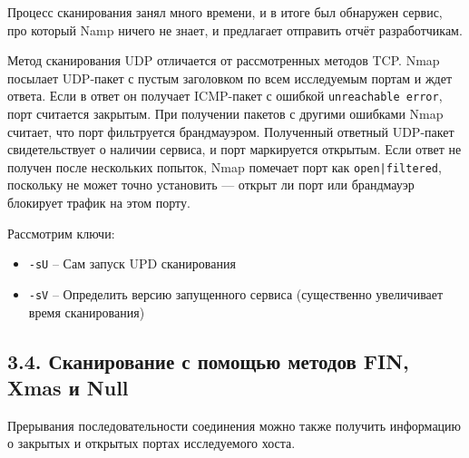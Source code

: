 Процесс сканирования занял много времени, и в итоге был обнаружен сервис, про который Namp ничего не знает, и предлагает отправить отчёт разработчикам.

Метод сканирования UDP отличается от рассмотренных методов TCP. Nmap посылает UDP-пакет с пустым заголовком по всем исследуемым портам и ждет ответа. Если в ответ он получает ICMP-пакет с ошибкой \texttt{unreachable error}, порт считается закрытым. При получении пакетов с другими ошибками Nmap считает, что порт фильтруется брандмауэром. Полученный ответный UDP-пакет свидетельствует о наличии сервиса, и порт маркируется открытым. Если ответ не получен после нескольких попыток, Nmap помечает порт как \texttt{open|filtered}, поскольку не может точно установить — открыт ли порт или брандмауэр блокирует трафик на этом порту.

Рассмотрим ключи:
\begin{itemize}
    \item \texttt{-sU} -- Сам запуск UPD сканирования
    \item \texttt{-sV} -- Определить версию запущенного сервиса (существенно увеличивает время сканирования)
\end{itemize}

\subsection*{3.4. Сканирование с помощью методов FIN, Xmas и Null}

Прерывания последовательности соединения можно также получить информацию о закрытых и открытых портах исследуемого хоста.

